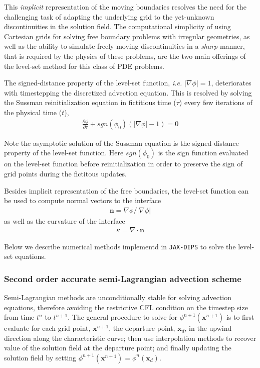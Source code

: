 \documentclass{elsarticle}
\begin{document}
This \textit{implicit} representation of the moving boundaries resolves the need for the challenging task of adapting the underlying grid to the yet-unknown discontinuities in the solution field. The computational simplicity of using Cartesian grids for solving free boundary problems with irregular geometries, as well as the ability to simulate freely moving discontinuities in a \textit{sharp}-manner, that is required by the physics of these problems, are the two main offerings of the level-set method for this class of PDE problems.

The signed-distance property of the level-set function, \textit{i.e.} $\vert \nabla \phi\vert =1 $, deteriorates with timestepping the discretized advection equation. This is resolved by solving the Sussman reinitialization equation \cite{SUSSMAN1994146} in fictitious time ($\tau$) every few iterations of the physical time ($t$),
\begin{align}
	\frac{\partial \phi}{\partial \tau} + sgn(\phi_0) (\vert \nabla \phi \vert - 1) = 0 \label{eq::sussman}
\end{align}

Note the asymptotic solution of the Sussman equation is the signed-distance property of the level-set function. Here $sgn(\phi_0)$ is the sign function evaluated on the level-set function before reinitialization in order to preserve the sign of grid points during the fictitous updates.

Besides implicit representation of the free boundaries, the level-set function can be used to compute normal vectors to the interface 
\begin{align*}
	\mathbf{n} = \nabla\phi / \vert \nabla \phi \vert 
\end{align*}
as well as the curvature of the interface
\begin{align*}
	\kappa = \nabla \cdot \mathbf{n}
\end{align*}



Below we describe numerical methods implementd in \texttt{JAX-DIPS} to solve the level-set equations.

\subsubsection{Second order accurate semi-Lagrangian advection scheme}
Semi-Lagrangian methods are unconditionally stable for solving advection equations, therefore avoiding the restrictive CFL condition on the timestep size from time $t^n$ to $t^{n+1}$. The general procedure to solve for $\phi^{n+1}(\mathbf{x}^{n+1})$ is to first evaluate for each grid point, $\mathbf{x}^{n+1}$, the departure point, $\mathbf{x}_d$, in the upwind direction along the characteristic curve; then use interpolation methods to recover value of the solution field at the departure point; and finally updating the solution field by setting $\phi^{n+1}(\mathbf{x}^{n+1})=\phi^n(\mathbf{x}_d)$.
\end{document}
